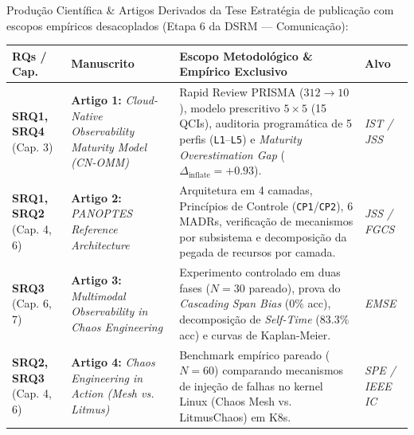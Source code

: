 \documentclass[aspectratio=169, 10pt]{beamer}
\begin{document}
\begin{frame}{Produção Científica \& Artigos Derivados da Tese}
  \vspace{-0.5ex}
  \scriptsize
  Estratégia de publicação com escopos empíricos desacoplados (Etapa 6 da DSRM --- Comunicação):
  \vspace{0.5ex}
  \renewcommand{\arraystretch}{1.15}
  \begin{tabularx}{\textwidth}{l p{3.6cm} X l}
    \toprule
    \textbf{RQs / Cap.} & \textbf{Manuscrito} & \textbf{Escopo Metodológico \& Empírico Exclusivo} & \textbf{Alvo} \\
    \midrule
    \textbf{SRQ1, SRQ4} \newline (Cap. 3) & \textbf{Artigo 1:} \textit{Cloud-Native Observability Maturity Model (CN-OMM)} & Rapid Review PRISMA ($312 \rightarrow 10$), modelo prescritivo $5\times5$ (15 QCIs), auditoria programática de 5 perfis (\texttt{L1}--\texttt{L5}) e \textit{Maturity Overestimation Gap} ($\Delta_{\text{inflate}} = +0.93$). & \textit{IST / JSS} \\
    \addlinespace[2pt]
    \textbf{SRQ1, SRQ2} \newline (Cap. 4, 6) & \textbf{Artigo 2:} \textit{PANOPTES Reference Architecture} & Arquitetura em 4 camadas, Princípios de Controle (\texttt{CP1}/\texttt{CP2}), 6 MADRs, verificação de mecanismos por subsistema e decomposição da pegada de recursos por camada. & \textit{JSS / FGCS} \\
    \addlinespace[2pt]
    \textbf{SRQ3} \newline (Cap. 6, 7) & \textbf{Artigo 3:} \textit{Multimodal Observability in Chaos Engineering} & Experimento controlado em duas fases ($N=30$ pareado), prova do \textit{Cascading Span Bias} ($0\%$ acc), decomposição de \textit{Self-Time} ($83.3\%$ acc) e curvas de Kaplan-Meier. & \textit{EMSE} \\
    \addlinespace[2pt]
    \textbf{SRQ2, SRQ3} \newline (Cap. 4, 6) & \textbf{Artigo 4:} \textit{Chaos Engineering in Action (Mesh vs. Litmus)} & Benchmark empírico pareado ($N=60$) comparando mecanismos de injeção de falhas no kernel Linux (Chaos Mesh vs. LitmusChaos) em K8s. & \textit{SPE / IEEE IC} \\
    \bottomrule
  \end{tabularx}
\end{frame}

\end{document}
